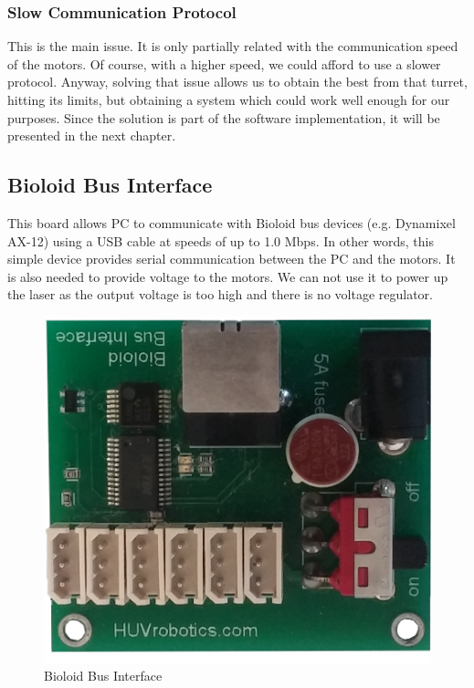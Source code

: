 \subsubsection{Slow Communication Protocol}
This is the main issue. It is only partially related with the communication speed of the motors. Of course, with a higher speed, we could afford to use a slower protocol. Anyway, solving that issue allows us to obtain the best from that turret, hitting its limits, but obtaining a system which could work well enough for our purposes. Since the solution is part of the software implementation, it will be presented in the next chapter.

\subsection{Bioloid Bus Interface}
This board allows PC to communicate with Bioloid bus devices (e.g. Dynamixel AX-12) using a USB cable at speeds of up to 1.0 Mbps. In other words,
this simple device provides serial communication between the PC and the motors. It is also needed to provide voltage to the motors. We can not use it to power up the laser as the output voltage is too high and there is no voltage regulator.
\begin{figure}
	\centering
	\includegraphics[width=.5\textwidth]{img/bioloid.png}%
	\caption{Bioloid Bus Interface}
	\label{fig:busInterface}
\end{figure}

